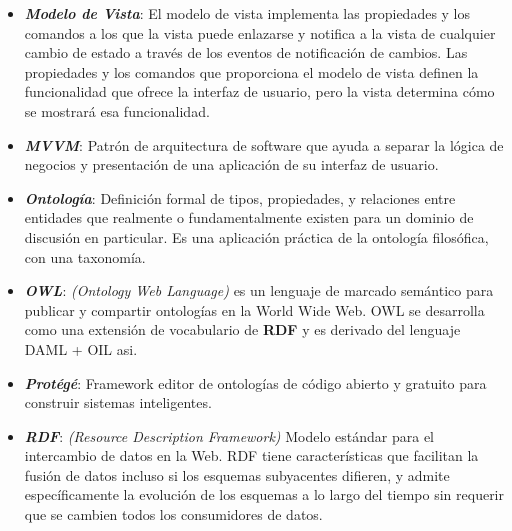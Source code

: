 \begin{itemize}
    \item \textbf{\textit{Modelo de Vista}}: El modelo de vista implementa las 
    propiedades y los comandos a los que la vista puede enlazarse y notifica 
    a la vista de cualquier cambio de estado a través de los eventos de 
    notificación de cambios. Las propiedades y los comandos que proporciona 
    el modelo de vista definen la funcionalidad que ofrece la interfaz de 
    usuario, pero la vista determina cómo se mostrará esa funcionalidad.
    
    \item \textbf{\textit{MVVM}}: Patrón de arquitectura de software que
    ayuda a separar la lógica de negocios y presentación de una aplicación 
    de su interfaz de usuario. 

    \item \textbf{\textit{Ontología}}:  Definición formal de tipos, propiedades, 
    y relaciones entre entidades que realmente o fundamentalmente existen 
    para un dominio de discusión en particular. Es una aplicación práctica 
    de la ontología filosófica, con una taxonomía.

    \item \textbf{\textit{OWL}}: \emph{(Ontology Web Language)} es un lenguaje 
    de marcado semántico para publicar y compartir ontologías en la 
    World Wide Web. OWL se desarrolla como una extensión de vocabulario 
    de \textbf{RDF} y es derivado del lenguaje DAML + OIL asi.


    \item \textbf{\textit{Protégé}}: Framework editor de ontologías de 
    código abierto y gratuito para construir sistemas inteligentes.

    \item \textbf{\textit{RDF}}: \emph{(Resource Description Framework)} 
    Modelo estándar para el intercambio de datos en la Web. RDF 
    tiene características que facilitan la fusión de datos incluso si 
    los esquemas subyacentes difieren, y admite específicamente la 
    evolución de los esquemas a lo largo del tiempo sin requerir que 
    se cambien todos los consumidores de datos.


\end{itemize}
